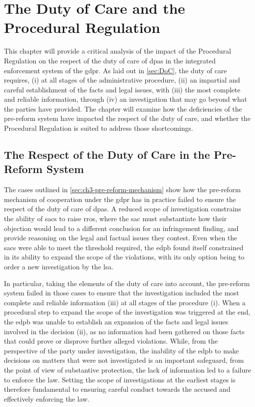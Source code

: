 \section{The Duty of Care and the Procedural Regulation}
\label{sec:ch4-duty-of-care-procedural-regulation}

This chapter will provide a critical analysis of the impact of the Procedural Regulation on the respect of the duty of care of \glspl{dpa} in the integrated enforcement system of the \gls{gdpr}.
As laid out in \cref{sec:DoC}, the duty of care requires, (i) at all stages of the administrative procedure, (ii) an impartial and careful establishment of the facts and legal issues, with (iii) the most complete and reliable information, through (iv) an investigation that may go beyond what the parties have provided.
The chapter will examine how the deficiencies of the pre-reform system have impacted the respect of the duty of care, and whether the Procedural Regulation is suited to address those shortcomings.

\subsection{The Respect of the Duty of Care in the Pre-Reform System}
\label{sec:ch4-pre-reform-system}

The cases outlined in \cref{sec:ch3-pre-reform-mechanism} show how the pre-reform mechanism of cooperation under the \gls{gdpr} has in practice failed to ensure the respect of the duty of care of \glspl{dpa}.
A reduced scope of investigation constrains the ability of \glspl{sac} to raise \glspl{rro}, where the \gls{sac} must substantiate how their objection would lead to a different conclusion for an infringement finding, and provide reasoning on the legal and factual issues they contest.\autocite[paras 12--13 and 16--17]{edpbGuidelines092020}
Even when the \glspl{sac} were able to meet the threshold required, the \gls{edpb} found itself constrained in its ability to expand the scope of the violations, with its only option being to order a new investigation by the \gls{lsa}.\autocite[25]{klozaIfItAint2026}

In particular, taking the elements of the duty of care into account, the pre-reform system failed in those cases to ensure that the investigation included the most complete and reliable information (iii) at all stages of the procedure (i).
When a procedural step to expand the scope of the investigation was triggered at the end, the \gls{edpb} was unable to establish an expansion of the facts and legal issues involved in the decision (ii), as no information had been gathered on those facts that could prove or disprove further alleged violations.
While, from the perspective of the party under investigation, the inability of the \gls{edpb} to make decisions on matters that were not investigated is an important safeguard, from the point of view of substantive protection, the lack of information led to a failure to enforce the law.
Setting the scope of investigations at the earliest stages is therefore fundamental to ensuring careful conduct towards the accused and effectively enforcing the law.

